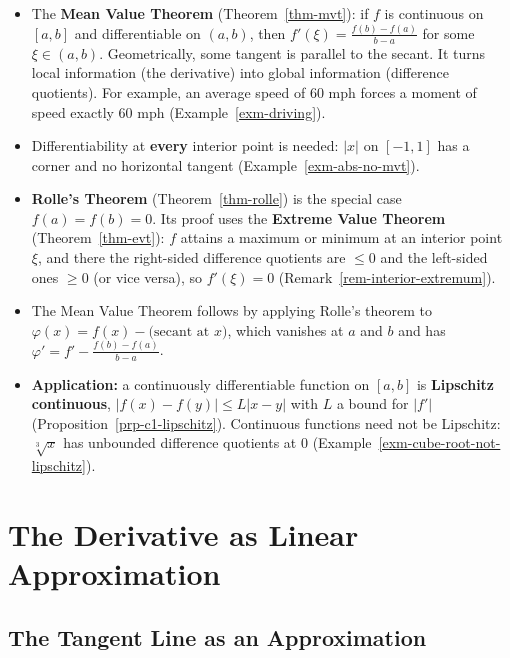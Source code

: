 \documentclass[
  letterpaper,
  DIV=11,
  numbers=noendperiod]{scrreprt}
\providecommand{\tightlist}{%
  \setlength{\itemsep}{0pt}\setlength{\parskip}{0pt}}
\theoremstyle{plain}
\theoremstyle{plain}
\theoremstyle{definition}
\theoremstyle{definition}
\theoremstyle{definition}
\theoremstyle{plain}
\theoremstyle{plain}
\theoremstyle{remark}
\begin{document}
\begin{itemize}
\tightlist
\item
  The \textbf{Mean Value Theorem} (Theorem~\ref{thm-mvt}): if \(f\) is
  continuous on \([a,b]\) and differentiable on \((a,b)\), then
  \(f'(\xi) = \frac{f(b)-f(a)}{b-a}\) for some \(\xi\in(a,b)\).
  Geometrically, some tangent is parallel to the secant. It turns local
  information (the derivative) into global information (difference
  quotients). For example, an average speed of \(60\) mph forces a
  moment of speed exactly \(60\) mph (Example~\ref{exm-driving}).
\item
  Differentiability at \textbf{every} interior point is needed:
  \(\lvert x \rvert\) on \([-1,1]\) has a corner and no horizontal
  tangent (Example~\ref{exm-abs-no-mvt}).
\item
  \textbf{Rolle's Theorem} (Theorem~\ref{thm-rolle}) is the special case
  \(f(a)=f(b)=0\). Its proof uses the \textbf{Extreme Value Theorem}
  (Theorem~\ref{thm-evt}): \(f\) attains a maximum or minimum at an
  interior point \(\xi\), and there the right-sided difference quotients
  are \(\le0\) and the left-sided ones \(\ge0\) (or vice versa), so
  \(f'(\xi)=0\) (Remark~\ref{rem-interior-extremum}).
\item
  The Mean Value Theorem follows by applying Rolle's theorem to
  \(\varphi(x) = f(x) - \big(\text{secant
  at } x\big)\), which vanishes at \(a\) and \(b\) and has
  \(\varphi' = f' - \frac{f(b)-f(a)}{b-a}\).
\item
  \textbf{Application:} a continuously differentiable function on
  \([a,b]\) is \textbf{Lipschitz continuous},
  \(\lvert f(x)-f(y) \rvert\le L\lvert x-y \rvert\) with \(L\) a bound
  for \(\lvert f' \rvert\) (Proposition~\ref{prp-c1-lipschitz}).
  Continuous functions need not be Lipschitz: \(\sqrt[3]{x}\) has
  unbounded difference quotients at \(0\)
  (Example~\ref{exm-cube-root-not-lipschitz}).
\end{itemize}

\chapter{The Derivative as Linear
Approximation}\label{the-derivative-as-linear-approximation}

\section{The Tangent Line as an
Approximation}\label{the-tangent-line-as-an-approximation}
\end{document}
